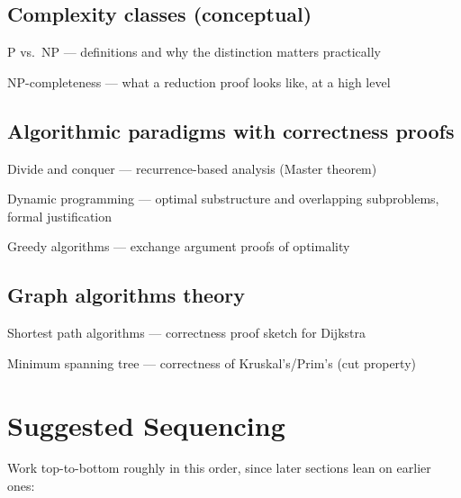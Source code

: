 \documentclass[11pt]{article}
\begin{document}
\subsection{Complexity classes (conceptual)}
\begin{tasklist}
    \item P vs.\ NP — definitions and why the distinction matters practically
    \item NP-completeness — what a reduction proof looks like, at a high level
\end{tasklist}

\subsection{Algorithmic paradigms with correctness proofs}
\begin{tasklist}
    \item Divide and conquer — recurrence-based analysis (Master theorem)
    \item Dynamic programming — optimal substructure and overlapping subproblems, formal justification
    \item Greedy algorithms — exchange argument proofs of optimality
\end{tasklist}

\subsection{Graph algorithms theory}
\begin{tasklist}
    \item Shortest path algorithms — correctness proof sketch for Dijkstra
    \item Minimum spanning tree — correctness of Kruskal's/Prim's (cut property)
\end{tasklist}

\section*{Suggested Sequencing}

Work top-to-bottom roughly in this order, since later sections lean on earlier ones:
\end{document}
